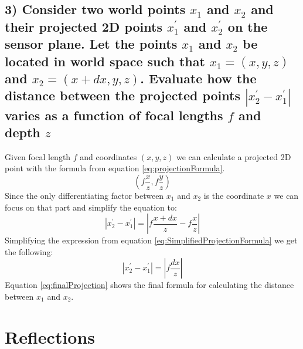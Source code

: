 \documentclass{article}
\begin{document}
    \subsection*{3)  Consider two world points $x_1$ and $x_2$ and their projected 2D points $x_1^\prime$ and $x_2^\prime$ on the sensor plane. Let the points $x_1$ and $x_2$ be located in world space such that $x_1=(x, y, z)$ and $x_2=(x+dx, y, z)$. Evaluate how the distance between the projected points  $|x_2^\prime - x_1^\prime|$ varies as a function of focal lengths $f$ and depth $z$}
    Given focal length $f$ and coordinates $(x, y, z)$ we can calculate a projected 2D point with the formula from equation \ref{eq:projectionFormula}.
    \begin{equation}
        \label{eq:projectionFormula}
        \left( f\frac{x}{z}, f\frac{y}{z} \right)
    \end{equation}
    Since the only differentiating factor between $x_1$ and $x_2$ is the coordinate $x$ we can focus on that part and simplify the equation to:
    \begin{equation}
        \label{eq:SimplifiedProjectionFormula}
        |x_2^\prime - x_1^\prime| = \left| f\frac{x+dx}{z} - f\frac{x}{z} \right|
    \end{equation}
    Simplifying the expression from equation \ref{eq:SimplifiedProjectionFormula} we get the following:
    \begin{equation}
        \label{eq:finalProjection}
        |x_2^\prime - x_1^\prime| = \left| f\frac{dx}{z} \right|
    \end{equation}
    Equation \ref{eq:finalProjection} shows the final formula for calculating the distance between $x_1$ and $x_2$.
    \section{Reflections}
\end{document}
